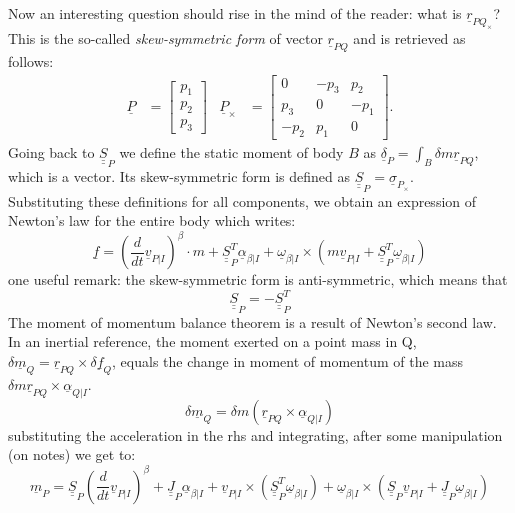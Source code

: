 Now an interesting question should rise in the mind of the reader: what is $\underline{r}_{{PQ}_\times}$? This is the so-called \textit{skew-symmetric form} of vector $\underline{r}_{PQ}$ and is retrieved as follows:
\begin{align}
    \underline{P} &= \begin{bmatrix}
        p_1\\p_2\\p_3
    \end{bmatrix} &\underline{P}_\times &= \begin{bmatrix}
        0 & -p_3 & p_2 \\
        p_3 & 0 & -p_1 \\
        -p_2 & p_1 & 0 
    \end{bmatrix}.
\end{align}
Going back to $\underline{\underline{S}}_P$ we define the static moment of body $B$ as $\underline{\delta}_P = \int_B \delta m \underline{r}_{PQ}$, which is a vector. Its skew-symmetric form is defined as $\underline{\underline{S}}_P = \underline{\sigma}_{P_\times}$.
\\
Substituting these definitions for all components, we obtain an expression of Newton's law for the entire body which writes:
\begin{equation}
    \underline{f} = \left(\frac{d}{dt}\underline{v}_{P|I}\right)^\beta \cdot m + \underline{\underline{S}}_P^T\underline{\alpha}_{\beta|I} + \underline{\omega}_{\beta|I} \times \left(m \underline{v}_{P|I}+\underline{\underline{S}}_P^T\underline{\omega}_{\beta|I}\right)
\end{equation}
one useful remark: the skew-symmetric form is anti-symmetric, which means that
\begin{equation}
    \underline{\underline{S}}_P = -\underline{\underline{S}}_P^T
\end{equation}
The moment of momentum balance theorem is a result of Newton's second law. In an inertial reference, the moment exerted on a point mass in Q, $\delta \underline{m}_Q = \underline{r}_{PQ}\times\delta\underline{f}_Q$, equals the change in moment of momentum of the mass $\delta m \underline{r}_{PQ} \times \underline{\alpha}_{Q|I}$.
\begin{equation}
    \delta \underline{m}_Q = \delta m (\underline{r}_{PQ} \times \underline{\alpha}_{Q|I})
\end{equation}
substituting the acceleration in the rhs and integrating, after some manipulation (on notes) we get to:
\begin{equation}
    \underline{m}_P = \underline{\underline{S}}_P\left(\frac{d}{dt}\underline{v}_{P|I}\right)^\beta + \underline{\underline{J}}_P\underline{\alpha}_{\beta|I} + \underline{v}_{P|I}\times (\underline{\underline {S}}_P^T\underline{\omega}_{\beta|I}) + \underline{\omega}_{\beta|I}\times (\underline{\underline{S}}_P\underline{v}_{P|I} + \underline{\underline{J}}_P\underline{\omega}_{\beta|I})
\end{equation}
